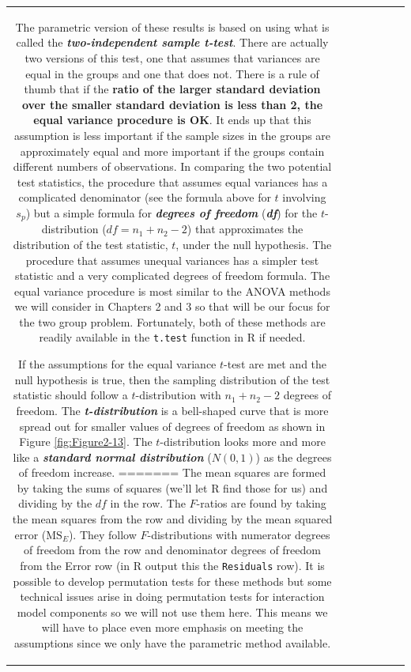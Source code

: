 \documentclass[]{book}
\theoremstyle{definition}
\theoremstyle{definition}
\theoremstyle{remark}
\begin{document}
\begin{longtable}[]{@{}ccccccc@{}}
\begin{minipage}[b]{0.10\columnwidth}
The parametric version of these results is based on using what is called
the \textbf{\emph{two-independent sample t-test}}. There are actually
two versions of this test, one that assumes that variances are equal in
the groups and one that does not. There is a rule of thumb that if the
\textbf{ratio of the larger standard deviation over the smaller standard
deviation is less than 2, the equal variance procedure is OK}. It ends
up that this assumption is less important if the sample sizes in the
groups are approximately equal and more important if the groups contain
different numbers of observations. In comparing the two potential test
statistics, the procedure that assumes equal variances has a complicated
denominator (see the formula above for \(t\) involving \(s_p\)) but a
simple formula for \textbf{\emph{degrees of freedom}}
(\textbf{\emph{df}}) for the \(t\)-distribution (\(df=n_1+n_2-2\)) that
approximates the distribution of the test statistic, \(t\), under the
null hypothesis. The procedure that assumes unequal variances has a
simpler test statistic and a very complicated degrees of freedom
formula. The equal variance procedure is most similar to the ANOVA
methods we will consider in Chapters 2 and 3 so that will be our focus
for the two group problem. Fortunately, both of these methods are
readily available in the \texttt{t.test} function in R if needed.

If the assumptions for the equal variance \(t\)-test are met and the
null hypothesis is true, then the sampling distribution of the test
statistic should follow a \(t\)-distribution with \(n_1+n_2-2\) degrees
of freedom. The \textbf{\emph{t-distribution}} is a bell-shaped curve
that is more spread out for smaller values of degrees of freedom as
shown in Figure \ref{fig:Figure2-13}. The \(t\)-distribution looks more
and more like a \textbf{\emph{standard normal distribution}}
(\(N(0,1)\)) as the degrees of freedom increase.
=======
The mean squares are formed by taking the sums of squares (we'll let R
find those for us) and dividing by the \(df\) in the row. The
\(F\)-ratios are found by taking the mean squares from the row and
dividing by the mean squared error (\(\text{MS}_E\)). They follow
\(F\)-distributions with numerator degrees of freedom from the row and
denominator degrees of freedom from the Error row (in R output this the
\texttt{Residuals} row). It is possible to develop permutation tests for
these methods but some technical issues arise in doing permutation tests
for interaction model components so we will not use them here. This
means we will have to place even more emphasis on meeting the
assumptions since we only have the parametric method available.


\end{minipage}
\end{longtable}
\end{document}
